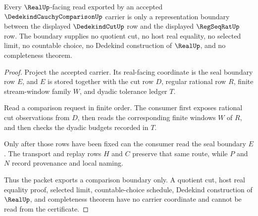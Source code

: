 \begin{theorem}
\label{thm:dedekind-cauchy-comparison-real-boundary}
Every $\RealUp$-facing read exported by an accepted $\DedekindCauchyComparisonUp$ carrier is only a representation boundary between the displayed $\DedekindCutUp$ row and the displayed $\RegSeqRatUp$ row. The boundary supplies no quotient cut, no host real equality, no selected limit, no countable choice, no Dedekind construction of $\RealUp$, and no completeness theorem.
\end{theorem}
\begin{proof}
Project the accepted carrier. Its real-facing coordinate is the seal boundary row $E$, and $E$ is stored together with the cut row $D$, regular rational row $R$, finite stream-window family $W$, and dyadic tolerance ledger $T$.

Read a comparison request in finite order. The consumer first exposes rational cut observations from $D$, then reads the corresponding finite windows $W$ of $R$, and then checks the dyadic budgets recorded in $T$.

Only after those rows have been fixed can the consumer read the seal boundary $E$. The transport and replay rows $H$ and $C$ preserve that same route, while $P$ and $N$ record provenance and local naming.

Thus the packet exports a comparison boundary only. A quotient cut, host real equality proof, selected limit, countable-choice schedule, Dedekind construction of $\RealUp$, and completeness theorem have no carrier coordinate and cannot be read from the certificate.
\end{proof}

\begin{closurestatus}{\DedekindCauchyComparisonUp}
  \theoryclosure{\seedClosure}
  \formalstatus{\theoremCheckedV}
\end{closurestatus}
